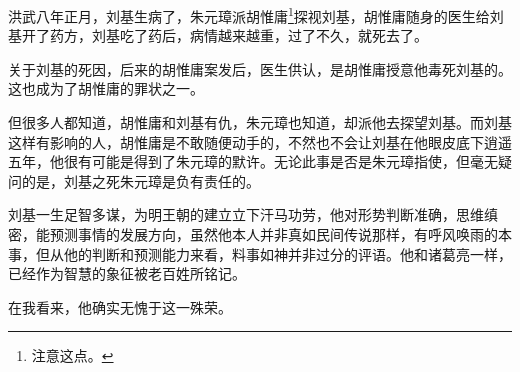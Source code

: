 \begin{multicols}{\theparacolNo}
		洪武八年正月，刘基生病了，朱元璋派胡惟庸\footnote{注意这点。}探视刘基，胡惟庸随身的医生给刘基开了药方，刘基吃了药后，病情越来越重，过了不久，就死去了。

		关于刘基的死因，后来的胡惟庸案发后，医生供认，是胡惟庸授意他毒死刘基的。这也成为了胡惟庸的罪状之一。

		但很多人都知道，胡惟庸和刘基有仇，朱元璋也知道，却派他去探望刘基。而刘基这样有影响的人，胡惟庸是不敢随便动手的，不然也不会让刘基在他眼皮底下逍遥五年，他很有可能是得到了朱元璋的默许。无论此事是否是朱元璋指使，但毫无疑问的是，刘基之死朱元璋是负有责任的。

		刘基一生足智多谋，为明王朝的建立立下汗马功劳，他对形势判断准确，思维缜密，能预测事情的发展方向，虽然他本人并非真如民间传说那样，有呼风唤雨的本事，但从他的判断和预测能力来看，料事如神并非过分的评语。他和诸葛亮一样，已经作为智慧的象征被老百姓所铭记。

		在我看来，他确实无愧于这一殊荣。
		\ifnum{}
	\end{multicols}
\fi
\newpage
